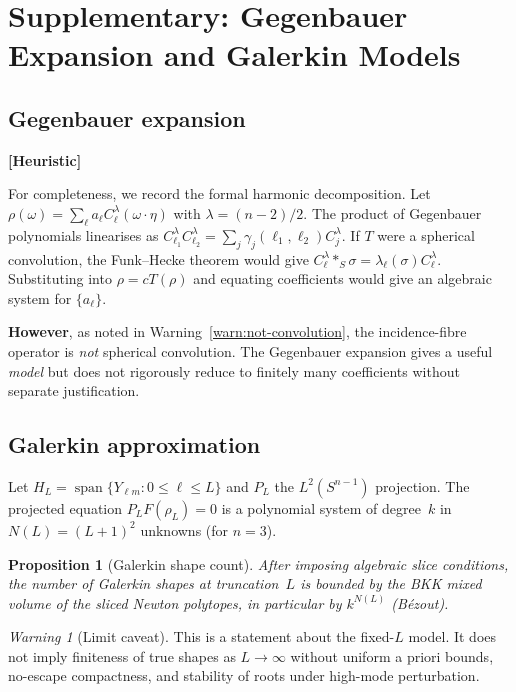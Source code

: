 \documentclass[12pt]{article}
\newtheorem{proposition}[theorem]{Proposition}
\theoremstyle{definition}
\theoremstyle{remark}
\newtheorem{warning}[theorem]{Warning}
\newcommand{\heuristic}{\textbf{\color{purple}[Heuristic]}}
\begin{document}
\section{Supplementary: Gegenbauer Expansion and Galerkin Models}
\label{sec:galerkin}

\subsection{Gegenbauer expansion}
\heuristic

For completeness, we record the formal harmonic decomposition.
Let $\rho(\omega)=\sum_\ell a_\ell C_\ell^\lambda(\omega\cdot\eta)$ with
$\lambda=(n-2)/2$.  The product of Gegenbauer polynomials linearises as
$C_{\ell_1}^\lambda C_{\ell_2}^\lambda
=\sum_j\gamma_j(\ell_1,\ell_2)C_j^\lambda$.
If $T$ were a spherical convolution, the Funk--Hecke theorem would give
$C_\ell^\lambda\ast_S\sigma=\lambda_\ell(\sigma)C_\ell^\lambda$.
Substituting into $\rho=cT(\rho)$ and equating coefficients would give an
algebraic system for $\{a_\ell\}$.

\textbf{However}, as noted in Warning~\ref{warn:not-convolution}, the
incidence-fibre operator is \emph{not} spherical convolution.  The
Gegenbauer expansion gives a useful \emph{model} but does not rigorously
reduce to finitely many coefficients without separate justification.

\subsection{Galerkin approximation}

Let $H_L=\operatorname{span}\{Y_{\ell m}:0\leq\ell\leq L\}$ and $P_L$ the
$L^2(S^{n-1})$ projection.  The projected equation $P_LF(\rho_L)=0$ is a
polynomial system of degree~$k$ in $N(L)=(L+1)^2$ unknowns (for $n=3$).

\begin{proposition}[Galerkin shape count]
  After imposing algebraic slice conditions, the number of Galerkin shapes
  at truncation~$L$ is bounded by the BKK mixed volume of the sliced
  Newton polytopes, in particular by $k^{N(L)}$ (B\'ezout).
\end{proposition}

\begin{warning}[Limit caveat]
  This is a statement about the fixed-$L$ model.  It does not imply
  finiteness of true shapes as $L\to\infty$ without uniform a priori bounds,
  no-escape compactness, and stability of roots under high-mode
  perturbation.
\end{warning}
\end{document}
